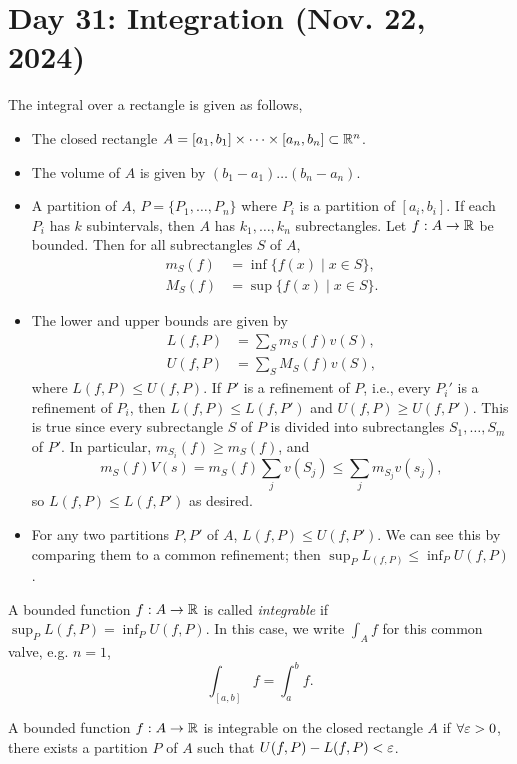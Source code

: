 \section{Day 31: Integration (Nov. 22, 2024)}
The integral over a rectangle is given as follows,
\begin{itemize}
    \item The closed rectangle $A = [a_1, b_1] \times \dots \times [a_n, b_n] \subset \mathbb R^n$.
    \item The volume of $A$ is given by $(b_1 - a_1) \dots (b_n - a_n)$.
    \item A partition of $A$, $P = \{P_1, \dots, P_n\}$ where $P_i$ is a partition of $[a_i, b_i]$. If each $P_i$ has $k$ subintervals, then $A$ has $k_1, \dots, k_n$ subrectangles. Let $f : A \to \mathbb R$ be bounded. Then for all subrectangles $S$ of $A$,
    \begin{align*}
        m_S(f) &= \inf \{f(x) \mid x \in S\}, \\
        M_S(f) &= \sup \{f(x) \mid x \in S\}.
    \end{align*} 
    \item The lower and upper bounds are given by
    \begin{align*}
        L(f, P) &= \sum_S m_S(f) v(S), \\
        U(f, P) &= \sum_S M_S(f) v(S),
    \end{align*}
    where $L(f, P) \leq U(f, P)$. If $P'$ is a refinement of $P$, i.e., every $P_i'$ is a refinement of $P_i$, then $L(f, P) \leq L(f, P')$ and $U(f, P) \geq U(f, P')$. This is true since every subrectangle $S$ of $P$ is divided into subrectangles $S_1, \dots, S_m$ of $P'$. In particular, $m_{S_i}(f) \geq m_S(f)$, and
    \[ m_S(f) V(s) = m_S(f) \sum_j v(S_j) \leq \sum_j m_{S_j} v(s_j), \]
    so $L(f, P) \leq L(f, P')$ as desired.
    \item For any two partitions $P, P'$ of $A$, $L(f, P) \leq U(f, P')$. We can see this by comparing them to a common refinement; then $\sup_P L_(f, P) \leq \inf_P U(f, P)$. 
\end{itemize}
\begin{definition}
    A bounded function $f : A \to \mathbb R$ is called \textit{integrable} if $\sup_P L(f, P) = \inf_P U(f, P)$. In this case, we write $\int_A f$ for this common valve, e.g. $n = 1$, 
    \[ \int_{[a, b]} f = \int_a^b f. \]
\end{definition}
\begin{simplelemma}
    A bounded function $f : A \to \mathbb R$ is integrable on the closed rectangle $A$ if $\forall \varepsilon > 0$, there exists a partition $P$ of $A$ such that $U(f, P) - L(f, P) < \varepsilon$.
\end{simplelemma}
